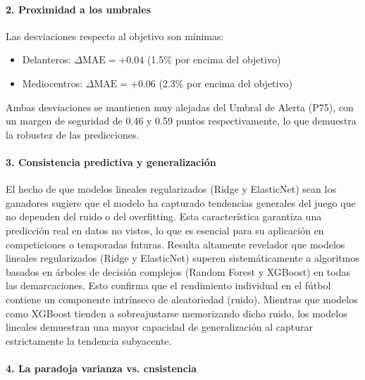 \paragraph{2. Proximidad a los umbrales}

Las desviaciones respecto al objetivo son mínimas:

\begin{itemize}
  \item Delanteros: $\Delta \mathrm{MAE} = +0.04$ (1.5\% por encima 
        del objetivo)
  
  \item Mediocentros: $\Delta \mathrm{MAE} = +0.06$ (2.3\% por 
        encima del objetivo)
\end{itemize}

Ambas desviaciones se mantienen muy alejadas del Umbral de Alerta 
(P75), con un margen de seguridad de 0.46 y 0.59 puntos 
respectivamente, lo que demuestra la robustez de las 
predicciones.


\paragraph{3. Consistencia predictiva y generalización}

El hecho de que modelos lineales regularizados (Ridge y ElasticNet) 
sean los ganadores sugiere que el modelo ha capturado 
tendencias generales del juego que no dependen del ruido o del 
overfitting. Esta característica garantiza una predicción real en 
datos no vistos, lo que es esencial para su aplicación en 
competiciones o temporadas futuras. Resulta altamente revelador que modelos 
lineales regularizados (Ridge y 
ElasticNet) superen sistemáticamente a algoritmos basados en árboles de 
decisión complejos (Random Forest y XGBoost) en todas las demarcaciones. 
Esto confirma que el rendimiento individual en el fútbol contiene un 
componente intrínseco de aleatoriedad (ruido). Mientras que modelos como 
XGBoost tienden a sobreajustarse memorizando dicho ruido, 
los modelos lineales demuestran una mayor capacidad de generalización al 
capturar estrictamente la tendencia subyacente.

\paragraph{4. La paradoja varianza vs. cnsistencia}

